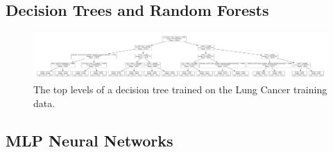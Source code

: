 \documentclass[a4paper,11pt]{article}
\begin{document}
\subsection{Decision Trees and Random Forests}

\begin{figure}
\centering 
\begin{center}
\includegraphics[width=.95\textwidth,origin=c]{lungdt.pdf}
\caption{\label{fig:lungdt} The top levels of a decision tree trained on the Lung Cancer training data.}
\end{center}
\end{figure}


\subsection{MLP Neural Networks}















\end{document}
